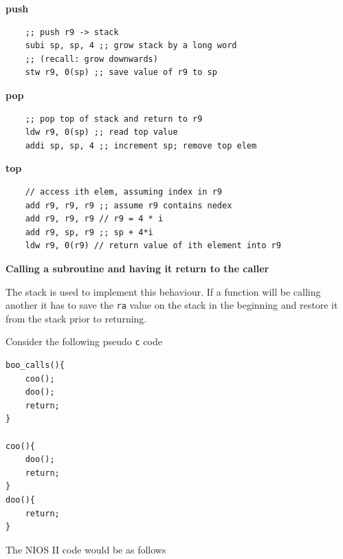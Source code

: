 \documentclass[../notes.tex]{subfiles}
\begin{document}
\begin{definition}
	\textbf{push}  
	\begin{listing}[H]
	\begin{verbatim}
	;; push r9 -> stack
	subi sp, sp, 4 ;; grow stack by a long word
	;; (recall: grow downwards)
	stw r9, 0(sp) ;; save value of r9 to sp
	\end{verbatim}
	\end{listing}


	\textbf{pop}  
	\begin{listing}[H]
	\begin{verbatim}
	;; pop top of stack and return to r9
	ldw r9, 0(sp) ;; read top value
	addi sp, sp, 4 ;; increment sp; remove top elem
	\end{verbatim}
	\end{listing}

	\textbf{top}  
	\begin{listing}[H]
	\begin{verbatim}
	// access ith elem, assuming index in r9
	add r9, r9, r9 ;; assume r9 contains nedex
	add r9, r9, r9 // r9 = 4 * i
	add r9, sp, r9 ;; sp + 4*i
	ldw r9, 0(r9) // return value of ith element into r9
	\end{verbatim}
	\end{listing}
\end{definition}


\textbf{Calling a subroutine and having it return to the caller}  


The stack is used to implement this behaviour.
If a function will be calling another it has to save the \texttt{ra}  value on the stack in the beginning and restore it from the stack prior to returning.

Consider the following pseudo \texttt{c} code

\begin{listing}[H]
\begin{verbatim}
boo_calls(){
	coo();
	doo();
	return;
}

coo(){
	doo();
	return;
}
doo(){
	return;
}
\end{verbatim}
\end{listing}

The NIOS II code would be as follows
\end{document}
